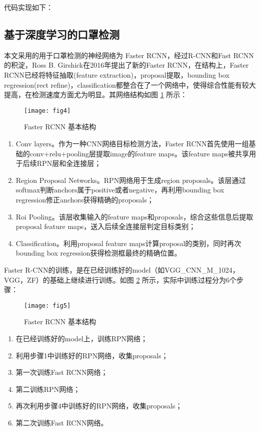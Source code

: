 代码实现如下：

\vspace{0.3cm}



\subsection{基于深度学习的口罩检测}

本文采用的用于口罩检测的神经网络为 Faster RCNN，经过R-CNN和Fast RCNN的积淀，Ross B. Girshick在2016年提出了新的Faster RCNN，在结构上，Faster RCNN已经将特征抽取(feature extraction)，proposal提取，bounding box regression(rect refine)，classification都整合在了一个网络中，使得综合性能有较大提高，在检测速度方面尤为明显。其网络结构如图 \ref{fig:faster-r-cnn} 所示：

\begin{figure}[!ht]
  \centering
  \texttt{[image: fig4]}
  \caption{Faster RCNN 基本结构}
  \label{fig:faster-r-cnn}
\end{figure} 

\begin{enumerate}
	\item[(1)] Conv layers。作为一种CNN网络目标检测方法，Faster RCNN首先使用一组基础的conv+relu+pooling层提取image的feature maps。该feature maps被共享用于后续RPN层和全连接层；
	\item[(2)] Region Proposal Networks。RPN网络用于生成region proposals。该层通过softmax判断anchors属于positive或者negative，再利用bounding box regression修正anchors获得精确的proposals；
	\item[(3)] Roi Pooling。该层收集输入的feature maps和proposals，综合这些信息后提取proposal feature maps，送入后续全连接层判定目标类别；
	\item[(4)] Classification。利用proposal feature maps计算proposal的类别，同时再次bounding box regression获得检测框最终的精确位置。
\end{enumerate}

Faster R-CNN的训练，是在已经训练好的model（如VGG\_CNN\_M\_1024，VGG，ZF）的基础上继续进行训练。如图 \ref{fig:train} 所示，实际中训练过程分为6个步骤：

\begin{figure}[!ht]
  \centering
  \texttt{[image: fig5]}
  \caption{Faster RCNN 基本结构}
  \label{fig:train}
\end{figure} 

\begin{enumerate}
	\item[(1)] 在已经训练好的model上，训练RPN网络；
	\item[(2)] 利用步骤1中训练好的RPN网络，收集proposals；
	\item[(3)] 第一次训练Fast RCNN网络；
	\item[(4)] 第二训练RPN网络；
	\item[(5)] 再次利用步骤4中训练好的RPN网络，收集proposals；
	\item[(6)] 第二次训练Fast RCNN网络。
\end{enumerate}

